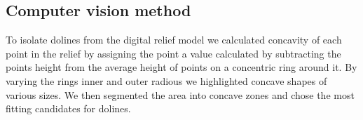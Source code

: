 \documentclass[a0,portrait]{a0poster}
\begin{document}
\begin{multicols}{2}


\section*{Computer vision method}

To isolate dolines from the digital relief model we calculated concavity of each point in the relief by assigning the point a value calculated by subtracting the points height from the average height of points on a concentric ring around it. By varying the rings inner and outer radious we highlighted concave shapes of various sizes.
We then segmented the area into concave zones and chose the most fitting candidates for dolines.


\end{multicols}
\end{document}
